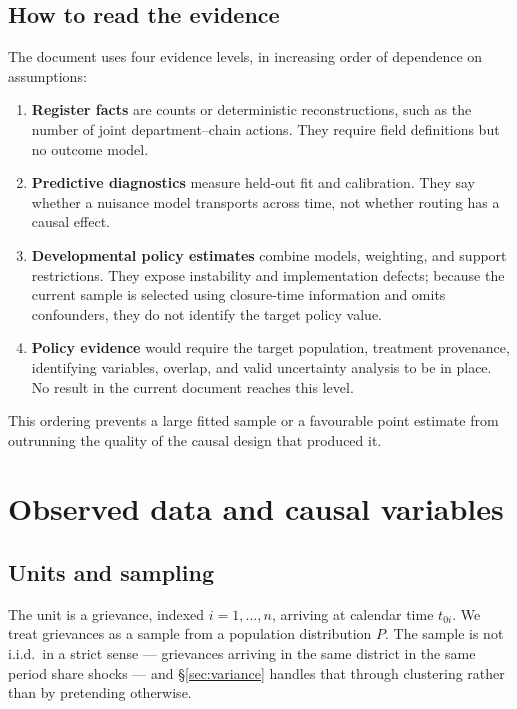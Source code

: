 \documentclass[11pt,a4paper]{article}
\theoremstyle{plain}
\theoremstyle{definition}
\theoremstyle{remark}
\begin{document}
\subsection{How to read the evidence}

The document uses four evidence levels, in increasing order of dependence on assumptions:

\begin{enumerate}[leftmargin=*]
\item \textbf{Register facts} are counts or deterministic reconstructions, such as the number
of joint department--chain actions. They require field definitions but no outcome model.
\item \textbf{Predictive diagnostics} measure held-out fit and calibration. They say whether a
nuisance model transports across time, not whether routing has a causal effect.
\item \textbf{Developmental policy estimates} combine models, weighting, and support
restrictions. They expose instability and implementation defects; because the current sample
is selected using closure-time information and omits confounders, they do not identify the
target policy value.
\item \textbf{Policy evidence} would require the target population, treatment provenance,
identifying variables, overlap, and valid uncertainty analysis to be in place. No result in the
current document reaches this level.
\end{enumerate}

This ordering prevents a large fitted sample or a favourable point estimate from outrunning the
quality of the causal design that produced it.

\section{Observed data and causal variables}\label{sec:setup}

\subsection{Units and sampling}

The unit is a grievance, indexed $i=1,\dots,n$, arriving at calendar time $t_{0i}$. We treat
grievances as a sample from a population distribution $P$. The sample is not i.i.d.\ in a
strict sense --- grievances arriving in the same district in the same period share shocks ---
and \S\ref{sec:variance} handles that through clustering rather than by pretending otherwise.
\end{document}
